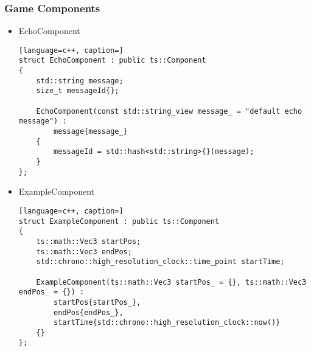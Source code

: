 \subsubsection{Game Components}
\label{sec:game_components}
\begin{itemize}
    \item EchoComponent
\begin{lstlisting}[language=c++, caption=]
struct EchoComponent : public ts::Component
{
    std::string message;
    size_t messageId{};

    EchoComponent(const std::string_view message_ = "default echo message") :
        message{message_}
    {
        messageId = std::hash<std::string>{}(message);
    }
};
\end{lstlisting}
    \item ExampleComponent
\begin{lstlisting}[language=c++, caption=]
struct ExampleComponent : public ts::Component
{
    ts::math::Vec3 startPos;
    ts::math::Vec3 endPos;
    std::chrono::high_resolution_clock::time_point startTime;

    ExampleComponent(ts::math::Vec3 startPos_ = {}, ts::math::Vec3 endPos_ = {}) :
        startPos{startPos_},
        endPos{endPos_},
        startTime{std::chrono::high_resolution_clock::now()}
    {}
};
\end{lstlisting}
\end{itemize}

